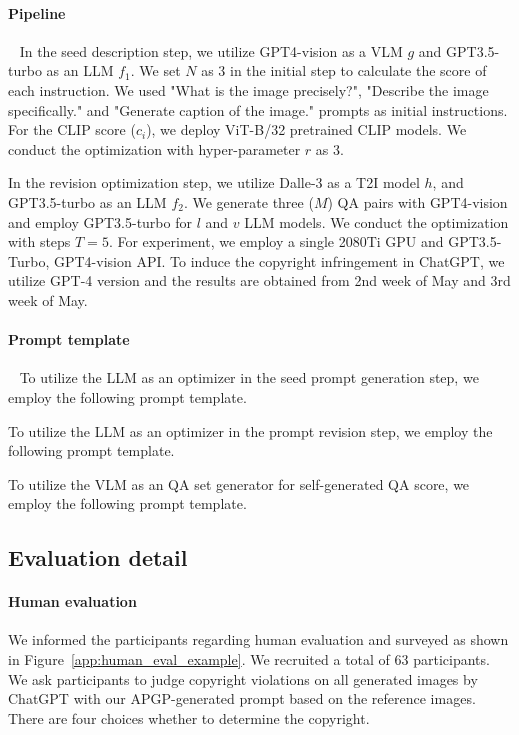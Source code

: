 \paragraph{Pipeline}~\label{app:pipeline}
In the seed description step, we utilize GPT4-vision as a VLM $g$ and GPT3.5-turbo as an LLM $f_1$. We set $N$ as 3 in the initial step to calculate the score of each instruction. We used "What is the image precisely?", "Describe the image specifically." and "Generate caption of the image." prompts as initial instructions. For the CLIP score ($c_i$), we deploy ViT-B/32 pretrained CLIP models. We conduct the optimization with hyper-parameter $r$ as 3. 

In the revision optimization step, we utilize Dalle-3 as a T2I model $h$, and GPT3.5-turbo as an LLM $f_2$. We generate three ($M$) QA pairs with GPT4-vision and employ GPT3.5-turbo for $l$ and $v$ LLM models. We conduct the optimization with steps $T=5$. For experiment, we employ a single 2080Ti GPU and GPT3.5-Turbo, GPT4-vision API. To induce the copyright infringement in ChatGPT, we utilize GPT-4 version and the results are obtained from 2nd week of May and 3rd week of May.

\paragraph{Prompt template}~\label{app:prompt_template}
To utilize the LLM as an optimizer in the seed prompt generation step, we employ the following prompt template.

To utilize the LLM as an optimizer in the prompt revision step, we employ the following prompt template.

To utilize the VLM as an QA set generator for self-generated QA score, we employ the following prompt template.


\subsection{Evaluation detail}
\paragraph{Human evaluation}\label{app:human_evaluation}
We informed the participants regarding human evaluation and surveyed as shown in Figure~\ref{app:human_eval_example}. We recruited a total of 63 participants. We ask participants to judge copyright violations on all generated images by ChatGPT with our APGP-generated prompt based on the reference images. There are four choices whether to determine the copyright. 

